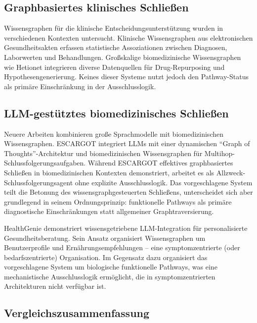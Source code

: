 \documentclass[12pt,a4paper]{article}
\begin{document}
\subsection{Graphbasiertes klinisches Schließen}

Wissensgraphen für die klinische Entscheidungsunterstützung wurden in verschiedenen Kontexten untersucht. Klinische Wissensgraphen aus elektronischen Gesundheitsakten \citep{Rotmensch2017} erfassen statistische Assoziationen zwischen Diagnosen, Laborwerten und Behandlungen. Großskalige biomedizinische Wissensgraphen wie Hetionet \citep{Himmelstein2017} integrieren diverse Datenquellen für Drug-Repurposing und Hypothesengenerierung. Keines dieser Systeme nutzt jedoch den Pathway-Status als primäre Einschränkung in der Ausschlusslogik.

\subsection{LLM-gestütztes biomedizinisches Schließen}

Neuere Arbeiten kombinieren große Sprachmodelle mit biomedizinischen Wissensgraphen. ESCARGOT \citep{Matsumoto2025} integriert LLMs mit einer dynamischen "`Graph of Thoughts"'-Architektur und biomedizinischen Wissensgraphen für Multihop-Schlussfolgerungsaufgaben. Während ESCARGOT effektives graphbasiertes Schließen in biomedizinischen Kontexten demonstriert, arbeitet es als Allzweck-Schlussfolgerungsagent ohne explizite Ausschlusslogik. Das vorgeschlagene System teilt die Betonung des wissensgraphgesteuerten Schließens, unterscheidet sich aber grundlegend in seinem Ordnungsprinzip: funktionelle Pathways als primäre diagnostische Einschränkungen statt allgemeiner Graphtraversierung.

HealthGenie \citep{Gao2025} demonstriert wissensgetriebene LLM-Integration für personalisierte Gesundheitsberatung. Sein Ansatz organisiert Wissensgraphen um Benutzerprofile und Ernährungsempfehlungen -- eine symptomzentrierte (oder bedarfszentrierte) Organisation. Im Gegensatz dazu organisiert das vorgeschlagene System um biologische funktionelle Pathways, was eine mechanistische Ausschlusslogik ermöglicht, die in symptomzentrierten Architekturen nicht verfügbar ist.

\subsection{Vergleichszusammenfassung}
\end{document}
